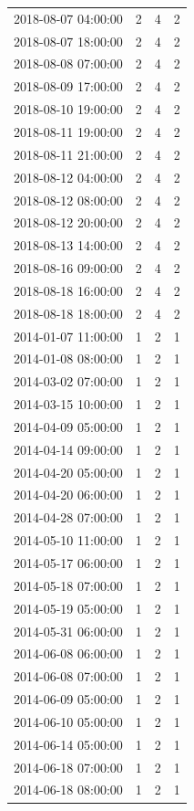 \begin{tabular}{lrrr}
2018-08-07 04:00:00 & 2 & 4 & 2 \\
2018-08-07 18:00:00 & 2 & 4 & 2 \\
2018-08-08 07:00:00 & 2 & 4 & 2 \\
2018-08-09 17:00:00 & 2 & 4 & 2 \\
2018-08-10 19:00:00 & 2 & 4 & 2 \\
2018-08-11 19:00:00 & 2 & 4 & 2 \\
2018-08-11 21:00:00 & 2 & 4 & 2 \\
2018-08-12 04:00:00 & 2 & 4 & 2 \\
2018-08-12 08:00:00 & 2 & 4 & 2 \\
2018-08-12 20:00:00 & 2 & 4 & 2 \\
2018-08-13 14:00:00 & 2 & 4 & 2 \\
2018-08-16 09:00:00 & 2 & 4 & 2 \\
2018-08-18 16:00:00 & 2 & 4 & 2 \\
2018-08-18 18:00:00 & 2 & 4 & 2 \\
2014-01-07 11:00:00 & 1 & 2 & 1 \\
2014-01-08 08:00:00 & 1 & 2 & 1 \\
2014-03-02 07:00:00 & 1 & 2 & 1 \\
2014-03-15 10:00:00 & 1 & 2 & 1 \\
2014-04-09 05:00:00 & 1 & 2 & 1 \\
2014-04-14 09:00:00 & 1 & 2 & 1 \\
2014-04-20 05:00:00 & 1 & 2 & 1 \\
2014-04-20 06:00:00 & 1 & 2 & 1 \\
2014-04-28 07:00:00 & 1 & 2 & 1 \\
2014-05-10 11:00:00 & 1 & 2 & 1 \\
2014-05-17 06:00:00 & 1 & 2 & 1 \\
2014-05-18 07:00:00 & 1 & 2 & 1 \\
2014-05-19 05:00:00 & 1 & 2 & 1 \\
2014-05-31 06:00:00 & 1 & 2 & 1 \\
2014-06-08 06:00:00 & 1 & 2 & 1 \\
2014-06-08 07:00:00 & 1 & 2 & 1 \\
2014-06-09 05:00:00 & 1 & 2 & 1 \\
2014-06-10 05:00:00 & 1 & 2 & 1 \\
2014-06-14 05:00:00 & 1 & 2 & 1 \\
2014-06-18 07:00:00 & 1 & 2 & 1 \\
2014-06-18 08:00:00 & 1 & 2 & 1 \\

\end{tabular}

